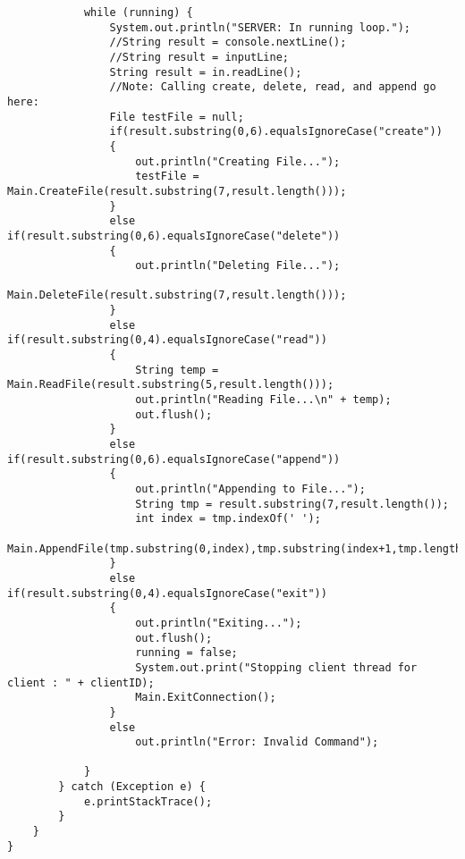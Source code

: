 \documentclass{article}
\begin{document}
\begin{lstlisting}
			while (running) {	
				System.out.println("SERVER: In running loop.");
				//String result = console.nextLine();
				//String result = inputLine;
				String result = in.readLine();
				//Note: Calling create, delete, read, and append go here:
				File testFile = null;
				if(result.substring(0,6).equalsIgnoreCase("create"))
				{
					out.println("Creating File...");
					testFile = Main.CreateFile(result.substring(7,result.length()));
				}
				else if(result.substring(0,6).equalsIgnoreCase("delete"))
				{
					out.println("Deleting File...");
					Main.DeleteFile(result.substring(7,result.length()));
				}
				else if(result.substring(0,4).equalsIgnoreCase("read"))
				{
					String temp = Main.ReadFile(result.substring(5,result.length()));
					out.println("Reading File...\n" + temp);
					out.flush();
				}
				else if(result.substring(0,6).equalsIgnoreCase("append"))
				{
					out.println("Appending to File...");
					String tmp = result.substring(7,result.length());
					int index = tmp.indexOf(' ');
					Main.AppendFile(tmp.substring(0,index),tmp.substring(index+1,tmp.length()));
				}
				else if(result.substring(0,4).equalsIgnoreCase("exit"))
				{
					out.println("Exiting...");
					out.flush();
					running = false;
					System.out.print("Stopping client thread for client : " + clientID);
					Main.ExitConnection();
				}
				else
					out.println("Error: Invalid Command");

			}
		} catch (Exception e) {
			e.printStackTrace();
		}
	}
}
		\end{lstlisting}
		
\end{document}
